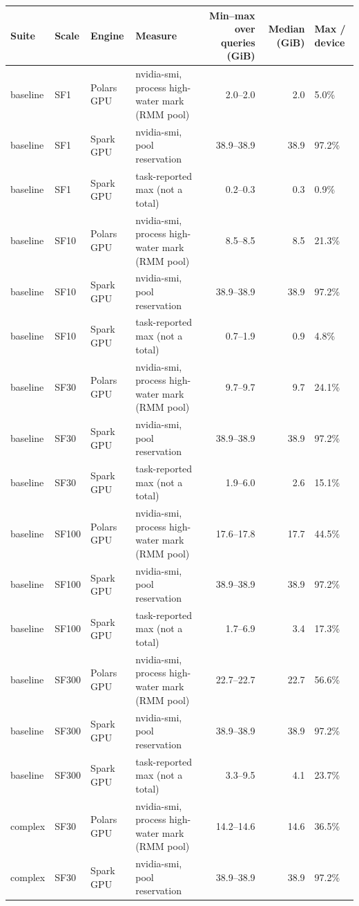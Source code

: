 \begin{tabular}{llllrrl}
\toprule
Suite & Scale & Engine & Measure & Min--max over queries (GiB) & Median (GiB) & Max / device \\
\midrule
baseline & SF1 & Polars GPU & nvidia-smi, process high-water mark (RMM pool) & 2.0--2.0 & 2.0 & 5.0\% \\
baseline & SF1 & Spark GPU & nvidia-smi, pool reservation & 38.9--38.9 & 38.9 & 97.2\% \\
baseline & SF1 & Spark GPU & task-reported max (not a total) & 0.2--0.3 & 0.3 & 0.9\% \\
baseline & SF10 & Polars GPU & nvidia-smi, process high-water mark (RMM pool) & 8.5--8.5 & 8.5 & 21.3\% \\
baseline & SF10 & Spark GPU & nvidia-smi, pool reservation & 38.9--38.9 & 38.9 & 97.2\% \\
baseline & SF10 & Spark GPU & task-reported max (not a total) & 0.7--1.9 & 0.9 & 4.8\% \\
baseline & SF30 & Polars GPU & nvidia-smi, process high-water mark (RMM pool) & 9.7--9.7 & 9.7 & 24.1\% \\
baseline & SF30 & Spark GPU & nvidia-smi, pool reservation & 38.9--38.9 & 38.9 & 97.2\% \\
baseline & SF30 & Spark GPU & task-reported max (not a total) & 1.9--6.0 & 2.6 & 15.1\% \\
baseline & SF100 & Polars GPU & nvidia-smi, process high-water mark (RMM pool) & 17.6--17.8 & 17.7 & 44.5\% \\
baseline & SF100 & Spark GPU & nvidia-smi, pool reservation & 38.9--38.9 & 38.9 & 97.2\% \\
baseline & SF100 & Spark GPU & task-reported max (not a total) & 1.7--6.9 & 3.4 & 17.3\% \\
baseline & SF300 & Polars GPU & nvidia-smi, process high-water mark (RMM pool) & 22.7--22.7 & 22.7 & 56.6\% \\
baseline & SF300 & Spark GPU & nvidia-smi, pool reservation & 38.9--38.9 & 38.9 & 97.2\% \\
baseline & SF300 & Spark GPU & task-reported max (not a total) & 3.3--9.5 & 4.1 & 23.7\% \\
complex & SF30 & Polars GPU & nvidia-smi, process high-water mark (RMM pool) & 14.2--14.6 & 14.6 & 36.5\% \\
complex & SF30 & Spark GPU & nvidia-smi, pool reservation & 38.9--38.9 & 38.9 & 97.2\% \\

\end{tabular}
